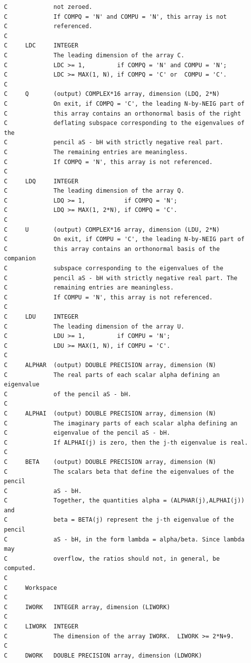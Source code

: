\documentclass[a4paper,10pt]{article}
\begin{document}
\begin{verbatim}
C             not zeroed. 
C             If COMPQ = 'N' and COMPU = 'N', this array is not
C             referenced.
C
C     LDC     INTEGER
C             The leading dimension of the array C.
C             LDC >= 1,         if COMPQ = 'N' and COMPU = 'N';
C             LDC >= MAX(1, N), if COMPQ = 'C' or  COMPU = 'C'.
C
C     Q       (output) COMPLEX*16 array, dimension (LDQ, 2*N)
C             On exit, if COMPQ = 'C', the leading N-by-NEIG part of
C             this array contains an orthonormal basis of the right
C             deflating subspace corresponding to the eigenvalues of the
C             pencil aS - bH with strictly negative real part.
C             The remaining entries are meaningless.
C             If COMPQ = 'N', this array is not referenced.
C
C     LDQ     INTEGER
C             The leading dimension of the array Q.
C             LDQ >= 1,           if COMPQ = 'N';
C             LDQ >= MAX(1, 2*N), if COMPQ = 'C'.
C
C     U       (output) COMPLEX*16 array, dimension (LDU, 2*N)
C             On exit, if COMPU = 'C', the leading N-by-NEIG part of
C             this array contains an orthonormal basis of the companion
C             subspace corresponding to the eigenvalues of the
C             pencil aS - bH with strictly negative real part. The
C             remaining entries are meaningless.
C             If COMPU = 'N', this array is not referenced.
C
C     LDU     INTEGER
C             The leading dimension of the array U.
C             LDU >= 1,         if COMPU = 'N';
C             LDU >= MAX(1, N), if COMPU = 'C'.
C
C     ALPHAR  (output) DOUBLE PRECISION array, dimension (N)
C             The real parts of each scalar alpha defining an eigenvalue
C             of the pencil aS - bH.
C
C     ALPHAI  (output) DOUBLE PRECISION array, dimension (N)
C             The imaginary parts of each scalar alpha defining an
C             eigenvalue of the pencil aS - bH.
C             If ALPHAI(j) is zero, then the j-th eigenvalue is real.
C
C     BETA    (output) DOUBLE PRECISION array, dimension (N)
C             The scalars beta that define the eigenvalues of the pencil
C             aS - bH.
C             Together, the quantities alpha = (ALPHAR(j),ALPHAI(j)) and
C             beta = BETA(j) represent the j-th eigenvalue of the pencil
C             aS - bH, in the form lambda = alpha/beta. Since lambda may
C             overflow, the ratios should not, in general, be computed.
C
C     Workspace
C
C     IWORK   INTEGER array, dimension (LIWORK)
C
C     LIWORK  INTEGER
C             The dimension of the array IWORK.  LIWORK >= 2*N+9.
C
C     DWORK   DOUBLE PRECISION array, dimension (LDWORK)

\end{verbatim}
\end{document}
